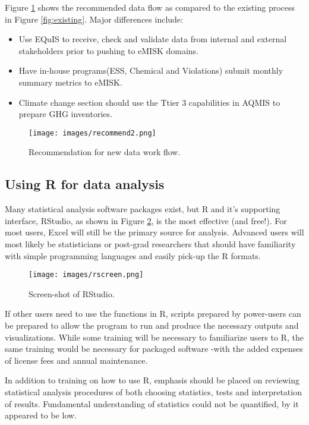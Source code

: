 Figure \ref{fig:recommend1} shows the recommended data flow as compared to the existing process in Figure \ref{fig:existing}. Major differences include:
\begin{itemize}
\item{Use EQuIS to receive, check and validate data from internal and external stakeholders prior to pushing to eMISK domains.}
\item{Have in-house programs(ESS, Chemical and Violations) submit monthly summary metrics to eMISK.}
\item{Climate change section should use the Ttier 3 capabilities in AQMIS to prepare GHG inventories.}
\end{itemize}

\begin{figure}[H]
\centering
\texttt{[image: images/recommend2.png]} 
\caption{Recommendation for new data work flow.}
\label{fig:recommend1}
\end{figure}

\subsection{Using R for data analysis}
Many statistical analysis software packages exist, but R and it's supporting interface, RStudio, as shown in Figure \ref{fig:rscreen}, is the most effective (and free!).  For most users, Excel will still be the primary source for analysis. Advanced users will most likely be statisticians or post-grad researchers that should have familiarity with simple programming languages and easily pick-up the R formats. 

\begin{figure}[H]
\centering
\texttt{[image: images/rscreen.png]} 
\caption{Screen-shot of RStudio.}
\label{fig:rscreen}
\end{figure}

If other users need to use the functions in R, scripts prepared by power-users can be prepared to allow the program to run and produce the necessary outputs and visualizations. While some training will be necessary to familiarize users to R, the same training would be necessary for packaged software -with the added expenses of license fees and annual maintenance.

In addition to training on how to use R, emphasis should be placed on reviewing statistical analysis procedures of both choosing statistics, tests and interpretation of results. Fundamental understanding of statistics could not be quantified, by it appeared to be low.

